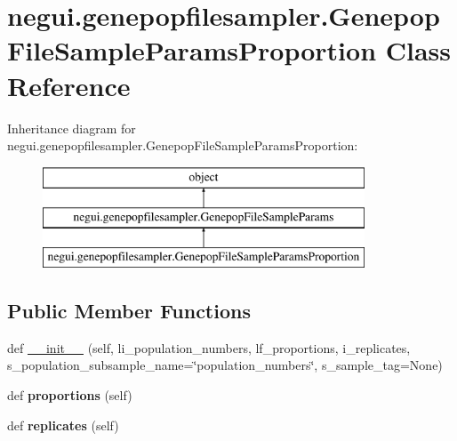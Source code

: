 \hypertarget{classnegui_1_1genepopfilesampler_1_1GenepopFileSampleParamsProportion}{}\section{negui.\+genepopfilesampler.\+Genepop\+File\+Sample\+Params\+Proportion Class Reference}
\label{classnegui_1_1genepopfilesampler_1_1GenepopFileSampleParamsProportion}
Inheritance diagram for negui.\+genepopfilesampler.\+Genepop\+File\+Sample\+Params\+Proportion\+:\begin{figure}[H]
\begin{center}
\leavevmode
\includegraphics[height=3.000000cm]{classnegui_1_1genepopfilesampler_1_1GenepopFileSampleParamsProportion}
\end{center}
\end{figure}
\subsection*{Public Member Functions}
\begin{DoxyCompactItemize}
\item 
def \hyperlink{classnegui_1_1genepopfilesampler_1_1GenepopFileSampleParamsProportion_a6085ba7e0d630b407bfc69b182bdf2b0}{\+\_\+\+\_\+init\+\_\+\+\_\+} (self, li\+\_\+population\+\_\+numbers, lf\+\_\+proportions, i\+\_\+replicates, s\+\_\+population\+\_\+subsample\+\_\+name=\char`\"{}population\+\_\+numbers\char`\"{}, s\+\_\+sample\+\_\+tag=None)
\item 
def {\bfseries proportions} (self)\hypertarget{classnegui_1_1genepopfilesampler_1_1GenepopFileSampleParamsProportion_a0b564f11df13b230af1cb7a86e1376e1}{}\label{classnegui_1_1genepopfilesampler_1_1GenepopFileSampleParamsProportion_a0b564f11df13b230af1cb7a86e1376e1}

\item 
def {\bfseries replicates} (self)\hypertarget{classnegui_1_1genepopfilesampler_1_1GenepopFileSampleParamsProportion_a02f9dceade460e92110713f991fa86e5}{}\label{classnegui_1_1genepopfilesampler_1_1GenepopFileSampleParamsProportion_a02f9dceade460e92110713f991fa86e5}

\end{DoxyCompactItemize}


